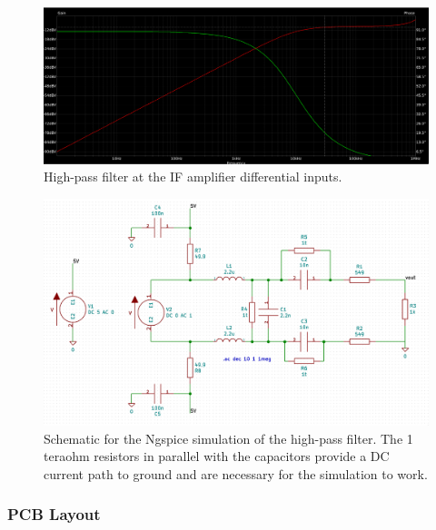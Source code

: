\begin{figure}[h]
        \centering
        \includegraphics[width=\textwidth]{data/mixer-if-amp-filter}
        \caption{High-pass filter at the IF amplifier differential inputs.}
        \label{fig:mixer-if-amp-filter}
\end{figure}

\begin{figure}[h]
        \centering
        \includegraphics[width=\textwidth]{data/mixer-if-amp-filter-schematic}
        \caption{Schematic for the Ngspice simulation of the high-pass filter. The 1 teraohm
          resistors in parallel with the capacitors provide a DC current path to ground and are
          necessary for the simulation to work.}
        \label{fig:mixer-if-amp-filter-schematic}
\end{figure}

\subsubsection{PCB Layout}
\label{sec:ada4940-2-pcb}

